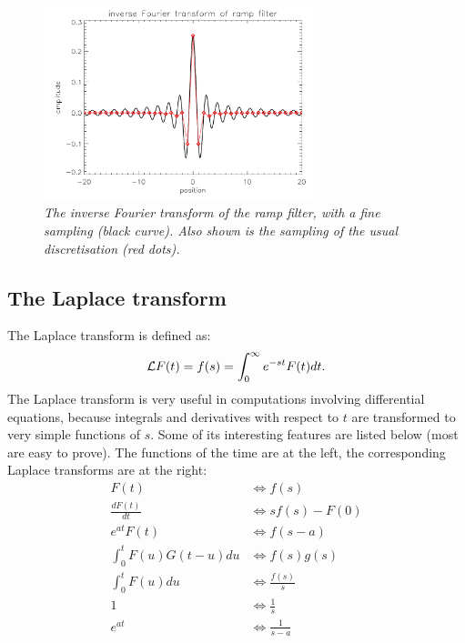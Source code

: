 \documentclass[11pt,oneside]{article}
\begin{document}
\begin{figure}[tb]
\centering
\includegraphics[width=0.7\textwidth]{figs/fig_rampfilter_app.pdf}
\caption{\label{fig:rampapp} \emph{The inverse Fourier transform of
    the ramp filter, with a fine sampling (black curve). Also shown is
    the sampling of the usual discretisation (red dots).}}
\end{figure}


\newpage
\subsection{The Laplace transform} \label{app:laplace}
The Laplace transform is defined as:
\begin{equation}
  {\cal L} F(t) = f(s) = \int_0^\infty e^{-st} F(t) dt.
\end{equation}
%
The Laplace transform is very useful in computations involving differential
equations, because integrals and derivatives with respect to $t$ are
transformed to very simple functions of $s$. Some of its interesting features
are listed below (most are easy to prove). The functions of the time are at
the left, the corresponding Laplace transforms are at the right:
\begin{align}
F(t)                        & \Longleftrightarrow f(s) \\
\frac{dF(t)}{dt}            & \Longleftrightarrow s f(s) - F(0) \\
e^{at} F(t)                 & \Longleftrightarrow f(s - a)\\
\int_0^t F(u) G(t - u) du   & \Longleftrightarrow f(s) g(s) \label{eq:lap1}\\
\int_0^t F(u) du            & \Longleftrightarrow \frac{f(s)}{s}\\
1                           & \Longleftrightarrow \frac{1}{s}\\
e^{at}                      & \Longleftrightarrow \frac{1}{s - a} \label{eq:lap2}
\end{align}
\end{document}
